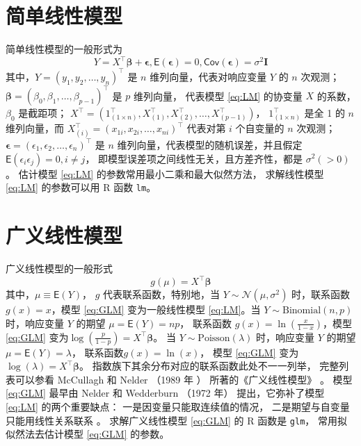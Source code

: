 \documentclass[12pt,a4paper,UTF8,twoside]{book}
\theoremstyle{definition}
\theoremstyle{definition}
\theoremstyle{definition}
\theoremstyle{remark}
\begin{document}
\hypertarget{sec:Linear-Models}{%
\section{简单线性模型}\label{sec:Linear-Models}}

简单线性模型的一般形式为 \begin{equation}
Y = X^{\top}\boldsymbol{\beta} + \boldsymbol{\epsilon}, \mathsf{E}(\boldsymbol{\epsilon}) = 0, \mathsf{Cov}(\boldsymbol{\epsilon}) = \sigma^2\mathbf{I}  \label{eq:LM}
\end{equation} \noindent 其中，\(Y = (y_1,y_2,\ldots,y_n)^{\top}\) 是
\(n\) 维列向量，代表对响应变量 \(Y\) 的 \(n\) 次观测；
\(\boldsymbol{\beta} = (\beta_0,\beta_1,\ldots,\beta_{p-1})^{\top}\) 是
\(p\) 维列向量， 代表模型 \eqref{eq:LM} 的协变量 \(X\) 的系数，\(\beta_0\)
是截距项；
\(X^{\top} = (1_{(1\times n)}^{\top},X_{(1)}^{\top},X_{(2)}^{\top},\ldots,X_{(p-1)}^{\top})\)，
\(1_{(1\times n)}^{\top}\) 是全 1 的 \(n\) 维列向量，而
\(X_{(i)}^{\top} = (x_{1i},x_{2i},\ldots,x_{ni})^{\top}\) 代表对第 \(i\)
个自变量的 \(n\) 次观测；
\(\boldsymbol{\epsilon} = (\epsilon_1,\epsilon_2,\ldots,\epsilon_n)^{\top}\)
是 \(n\) 维列向量，代表模型的随机误差，并且假定
\(\mathsf{E}(\epsilon_i \epsilon_j) = 0, i \ne j\)，
即模型误差项之间线性无关，且方差齐性，都是 \(\sigma^2(>0)\)。 估计模型
\eqref{eq:LM} 的参数常用最小二乘和最大似然方法， 求解线性模型 \eqref{eq:LM}
的参数可以用 R 函数 \texttt{lm}。

\hypertarget{sec:Generalized-Linear-Models}{%
\section{广义线性模型}\label{sec:Generalized-Linear-Models}}

广义线性模型的一般形式 \begin{equation}
g(\mu) = X^{\top}\boldsymbol{\beta}  \label{eq:GLM}
\end{equation} \noindent 其中，\(\mu \equiv \mathsf{E}(Y)\)， \(g\)
代表联系函数，特别地，当 \(Y \sim \mathcal{N}(\mu,\sigma^2)\)
时，联系函数 \(g(x) = x\)，模型 \eqref{eq:GLM} 变为一般线性模型
\eqref{eq:LM}。当 \(Y \sim \mathrm{Binomial}(n,p)\) 时，响应变量 \(Y\)
的期望 \(\mu =\mathsf{E}(Y) = np\)， 联系函数
\(g(x)=\ln(\frac{x}{1-x})\)，模型 \eqref{eq:GLM}
变为\(\log(\frac{p}{1-p})=X^{\top}\boldsymbol{\beta}\)。 当
\(Y \sim \mathrm{Poisson}(\lambda)\) 时，响应变量 \(Y\) 的期望
\(\mu =\mathsf{E}(Y) = \lambda\)， 联系函数\(g(x) = \ln(x)\)， 模型
\eqref{eq:GLM} 变为 \(\log(\lambda) = X^{\top}\boldsymbol{\beta}\)。
指数族下其余分布对应的联系函数此处不一一列举， 完整列表可以参看
McCullagh 和 Nelder （1989 年 ）\citep{McCullagh1989}
所著的《广义线性模型》 。 模型 \eqref{eq:GLM} 最早由 Nelder 和 Wedderburn
（1972 年）\citep{Nelder1972} 提出，它弥补了模型 \eqref{eq:LM}
的两个重要缺点： 一是因变量只能取连续值的情况，
二是期望与自变量只能用线性关系联系 \citep{Chen2011}。 求解广义线性模型
\eqref{eq:GLM} 的 R 函数是 \texttt{glm}， 常用拟似然法去估计模型
\eqref{eq:GLM} 的参数。
\end{document}
